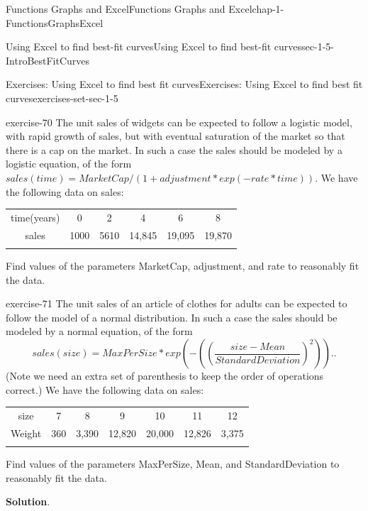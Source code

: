 \documentclass[oneside,10pt,]{book}
\numberwithin{equation}{section}
\newcommand{\hrulethin}  {\noalign{\hrule height 0.04em}}
\newcommand{\hrulemedium}{\noalign{\hrule height 0.07em}}
\newcommand{\hrulethick} {\noalign{\hrule height 0.11em}}
\begin{document}
\begin{chapterptx}{Functions Graphs and Excel}{}{Functions Graphs and Excel}{}{}{chap-1-FunctionsGraphsExcel}
\begin{sectionptx}{Using Excel to find best-fit curves}{}{Using Excel to find best-fit curves}{}{}{sec-1-5-IntroBestFitCurves}
\begin{exercises-subsection-numberless}{Exercises: Using Excel to find best fit curves}{}{Exercises: Using Excel to find best fit curves}{}{}{exercises-set-sec-1-5}
\begin{divisionexercise}{6}{}{}{exercise-70}
The unit sales of widgets can be expected to follow a logistic model, with rapid growth of sales, but with eventual saturation of the market so that there is a cap on the market.  In such a case the sales should be modeled by a logistic equation, of the form \(sales(time)=MarketCap/(1+adjustment*exp(-rate*time)).\) We have the following data on sales:%
\begin{sidebyside}{1}{0}{0}{0}%
\begin{sbspanel}{1}%
{\centering%
\begin{tabular}{cccccc}\hrulethick
time(years)&0&2&4&6&8\tabularnewline\hrulethin
sales&1000&5610&14,845&19,095&19,870\tabularnewline\hrulemedium
\end{tabular}
\par}
\end{sbspanel}%
\end{sidebyside}%
\par
\hypertarget{p-444}{}%
Find values of the parameters MarketCap, adjustment, and rate to reasonably fit the data.%
\end{divisionexercise}%
\begin{divisionexercise}{7}{}{}{exercise-71}%
\hypertarget{p-445}{}%
The unit sales of an article of clothes for adults can be expected to follow the model of a normal distribution.  In such a case the sales should be modeled by a normal equation, of the form%
\begin{equation*}
sales(size)=MaxPerSize*exp\left(-\left(\left(\frac{size-Mean}{StandardDeviation}\right)^2\right)\right).\text{.}
\end{equation*}
(Note we need an extra set of parenthesis to keep the order of operations correct.)  We have the following data on sales:%
\begin{sidebyside}{1}{0}{0}{0}%
\begin{sbspanel}{1}%
{\centering%
\begin{tabular}{ccccccc}\hrulethick
size&7&8&9&10&11&12\tabularnewline\hrulethin
Weight&360&3,390&12,820&20,000&12,826&3,375\tabularnewline\hrulemedium
\end{tabular}
\par}
\end{sbspanel}%
\end{sidebyside}%
\par
\hypertarget{p-446}{}%
Find values of the parameters MaxPerSize, Mean, and StandardDeviation to reasonably fit the data.%
\par\smallskip%
\noindent\textbf{Solution}.\hypertarget{solution-35}{}\quad%

\end{divisionexercise}
\end{exercises-subsection-numberless}
\end{sectionptx}
\end{chapterptx}
\end{document}
